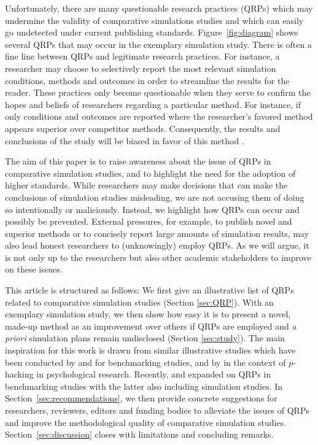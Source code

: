 \documentclass[a4paper, 11pt]{article}
\begin{document}
Unfortunately, there are many questionable research practices (QRPs) which may
undermine the validity of comparative simulations studies and which can easily
go undetected under current publishing standards. Figure~\ref{fig:diagram} shows
several QRPs that may occur in the exemplary simulation study. There is often a
fine line between QRPs and legitimate research practices. For instance, a
researcher may choose to selectively report the most relevant simulation
conditions, methods and outcomes in order to streamline the results for the
reader. These practices only become questionable when they serve to confirm the
hopes and beliefs of researchers regarding a particular method. For instance, if
only conditions and outcomes are reported where the researcher's favored method
appears superior over competitor methods. Consequently, the results and
conclusions of the study will be biased in favor of this method
\citep{Niessl2021}.

The aim of this paper is to raise awareness about the issue of QRPs in
comparative simulation studies, and to highlight the need for the adoption of
higher standards. While researchers may make decisions that can make the
conclusions of simulation studies misleading, we are not accusing them of doing
so intentionally or maliciously. Instead, we highlight how QRPs can occur and
possibly be prevented. External pressures, for example, to publish novel and
superior methods \citep{Boulesteix2015} or to concisely report large amounts of
simulation results, may also lead honest researchers to (unknowingly) employ
QRPs. As we will argue, it is not only up to the researchers but also other
academic stakeholders to improve on these issues.

This article is structured as follows: We first give an illustrative list of
QRPs related to comparative simulation studies (Section \ref{sec:QRP}). With an
exemplary simulation study, we then show how easy it is to present a novel,
made-up method as an improvement over others if QRPs are employed and \emph{a
  priori} simulation plans remain undisclosed (Section \ref{sec:study}). The
main inspiration for this work is drawn from similar illustrative studies which
have been conducted by \citet{Yousefi2009} and \citet{Jelizarow2010} for
benchmarking studies, and by \citet{Simmons2011} in the context of $p$-hacking
in psychological research. Recently, \citet{Niessl2021} and \citet{Ullmann2022}
expanded on QRPs in benchmarking studies with the latter also including
simulation studies. In Section~\ref{sec:recommendations}, we then provide
concrete suggestions for researchers, reviewers, editors and funding bodies to
alleviate the issues of QRPs and improve the methodological quality of
comparative simulation studies. Section~\ref{sec:discussion} closes with
limitations and concluding remarks.
\end{document}
